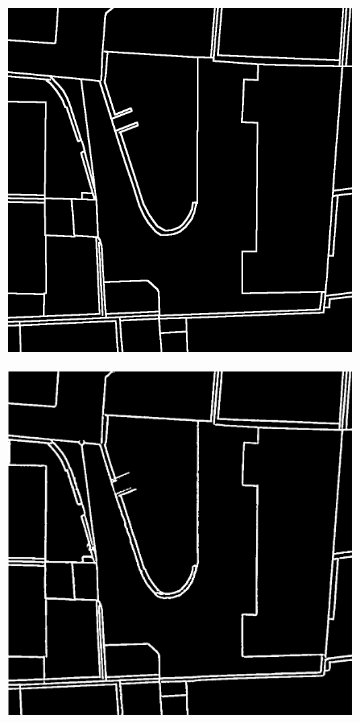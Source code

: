 \documentclass[12pt]{article}
\begin{document}
\begin{figure}[H]
\begin{subfigure}[b]{.28\textwidth}
\begin{minipage}[t]{1\linewidth}
			\includegraphics[width=1\linewidth]{images/patches/gt3.png}
		\end{minipage}
	\end{subfigure}
	\begin{subfigure}[b]{.28\textwidth}
		\begin{minipage}[t]{1\linewidth}
			\centering
			\includegraphics[width=1\linewidth]{images/patches/pre3.png}
		\end{minipage}
	\end{subfigure}



\end{figure}
\end{document}
